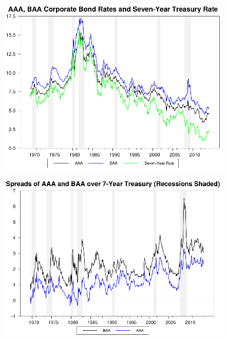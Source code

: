 \documentclass{beamer}
\begin{document}
\begin{frame}
  \begin{figure}
    \includegraphics{bond_rates.eps}
  \end{figure}
\end{frame}

\begin{frame}
  \begin{figure}
    \includegraphics{bond_rates2.eps}
  \end{figure}
\end{frame}
\end{document}

